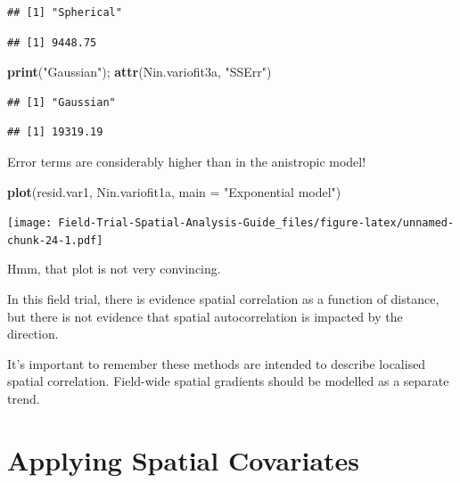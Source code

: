 \documentclass[]{book}
\newenvironment{Shaded}{\begin{snugshade}}{\end{snugshade}}
\newcommand{\DataTypeTok}[1]{\textcolor[rgb]{0.13,0.29,0.53}{#1}}
\newcommand{\KeywordTok}[1]{\textcolor[rgb]{0.13,0.29,0.53}{\textbf{#1}}}
\newcommand{\NormalTok}[1]{#1}
\newcommand{\StringTok}[1]{\textcolor[rgb]{0.31,0.60,0.02}{#1}}
\begin{document}
\begin{verbatim}
## [1] "Spherical"
\end{verbatim}

\begin{verbatim}
## [1] 9448.75
\end{verbatim}

\begin{Shaded}
\begin{Highlighting}[]
\KeywordTok{print}\NormalTok{(}\StringTok{"Gaussian"}\NormalTok{); }\KeywordTok{attr}\NormalTok{(Nin.variofit3a, }\StringTok{"SSErr"}\NormalTok{)}
\end{Highlighting}
\end{Shaded}

\begin{verbatim}
## [1] "Gaussian"
\end{verbatim}

\begin{verbatim}
## [1] 19319.19
\end{verbatim}

Error terms are considerably higher than in the anistropic model!

\begin{Shaded}
\begin{Highlighting}[]
\KeywordTok{plot}\NormalTok{(resid.var1, Nin.variofit1a, }\DataTypeTok{main =} \StringTok{"Exponential model"}\NormalTok{)}
\end{Highlighting}
\end{Shaded}

\texttt{[image: Field-Trial-Spatial-Analysis-Guide\_files/figure-latex/unnamed-chunk-24-1.pdf]}

Hmm, that plot is not very convincing.

In this field trial, there is evidence spatial correlation as a function of distance, but there is not evidence that spatial autocorrelation is impacted by the direction.

It's important to remember these methods are intended to describe localised spatial correlation. Field-wide spatial gradients should be modelled as a separate trend.

\hypertarget{ch4}{%
\chapter{Applying Spatial Covariates}\label{ch4}}
\end{document}

